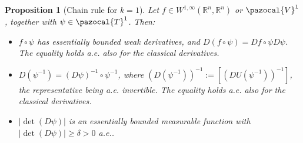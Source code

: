 \documentclass[english,a4paper,12pt,oneside]{scrbook}
\theoremstyle{break}
\newtheorem{prop}[equation]{Proposition}
\theoremstyle{remark}
\newcommand{\mR}{\mathbb{R}}
\newcommand{\cV}{\pazocal{V}}
\newcommand{\cT}{\pazocal{T}}
\begin{document}
\begin{prop}[Chain rule for $k=1$]
\label{prop:chain}
Let $f \in W^{1,\infty}(\mR^n,\mR^n)$ or $\cV^1$, together with $\psi \in \cT^1$.  Then:

\begin{itemize}

\item $f \circ \psi$ has essentially bounded weak derivatives, and $D(f \circ \psi) = Df \circ \psi D\psi$. The equality holds a.e. also for the classical derivatives.

\item  $D(\psi^{-1}) = (D\psi)^{-1} \circ \psi^{-1}$, where $(D(\psi^{-1}))^{-1}:=[(DU(\psi^{-1}))^{-1}]$, the representative being a.e. invertible. The equality holds a.e. also for the classical derivatives.

\item $|\det(D\psi)|$ is an essentially bounded measurable function with $|\det(D\psi)|\geq \delta>0$ a.e.. 
\end{itemize} 

\end{prop}
\end{document}
